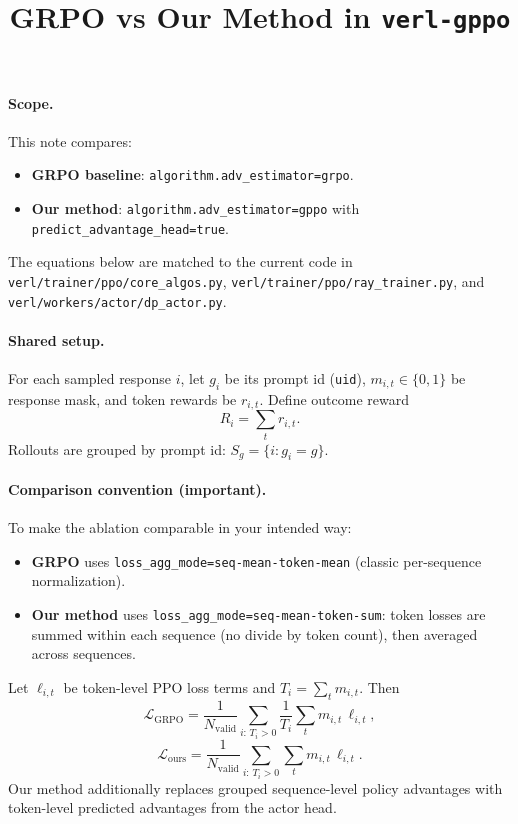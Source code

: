 \documentclass[11pt]{article}
\title{GRPO vs Our Method in \texttt{verl-gppo}}
\author{}
\date{}
\begin{document}
\maketitle

\paragraph{Scope.}
This note compares:
\begin{itemize}
\item \textbf{GRPO baseline}: \texttt{algorithm.adv\_estimator=grpo}.
\item \textbf{Our method}: \texttt{algorithm.adv\_estimator=gppo} with \texttt{predict\_advantage\_head=true}.
\end{itemize}
The equations below are matched to the current code in
\texttt{verl/trainer/ppo/core\_algos.py},
\texttt{verl/trainer/ppo/ray\_trainer.py},
and \texttt{verl/workers/actor/dp\_actor.py}.

\paragraph{Shared setup.}
For each sampled response \(i\), let \(g_i\) be its prompt id (\texttt{uid}), \(m_{i,t}\in\{0,1\}\) be response mask,
and token rewards be \(r_{i,t}\). Define outcome reward
\[
R_i=\sum_t r_{i,t}.
\]
Rollouts are grouped by prompt id: \(S_g=\{i: g_i=g\}\).

\paragraph{Comparison convention (important).}
To make the ablation comparable in your intended way:
\begin{itemize}
\item \textbf{GRPO} uses \texttt{loss\_agg\_mode=seq-mean-token-mean}
(classic per-sequence normalization).
\item \textbf{Our method} uses \texttt{loss\_agg\_mode=seq-mean-token-sum}:
token losses are summed within each sequence (no divide by token count), then averaged across sequences.
\end{itemize}
Let \(\ell_{i,t}\) be token-level PPO loss terms and \(T_i=\sum_t m_{i,t}\). Then
\[
\mathcal{L}_{\text{GRPO}}
=
\frac{1}{N_{\mathrm{valid}}}\sum_{i:\,T_i>0}
\frac{1}{T_i}\sum_t m_{i,t}\,\ell_{i,t},
\]
\[
\mathcal{L}_{\text{ours}}
=
\frac{1}{N_{\mathrm{valid}}}\sum_{i:\,T_i>0}
\sum_t m_{i,t}\,\ell_{i,t}.
\]
Our method additionally replaces grouped sequence-level policy advantages with token-level predicted
advantages from the actor head.
\end{document}
